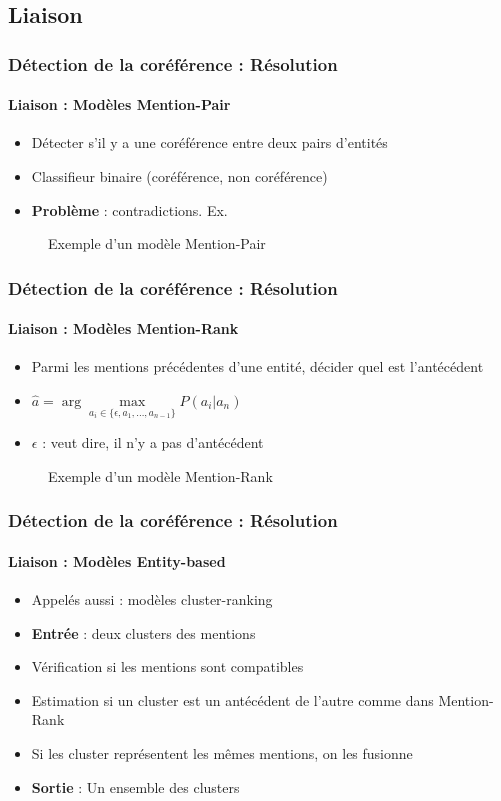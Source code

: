 \documentclass[xcolor=table]{beamer}
\begin{document}
\subsection{Liaison}

\begin{frame}
	\frametitle{Détection de la coréférence : Résolution}
	\framesubtitle{Liaison : Modèles Mention-Pair}
	
	\begin{itemize}
		\item Détecter s'il y a une coréférence entre deux pairs d'entités
		\item Classifieur binaire (coréférence, non coréférence)
		\item \textbf{Problème} : contradictions. Ex. 
	\end{itemize}
	\begin{figure}
		\centering
		\caption{Exemple d'un modèle Mention-Pair \cite{2019-jurafsky-martin}}
	\end{figure}
	
\end{frame}

\begin{frame}
	\frametitle{Détection de la coréférence : Résolution}
	\framesubtitle{Liaison : Modèles Mention-Rank}
	
	\begin{itemize}
		\item Parmi les mentions précédentes d'une entité, décider quel est l'antécédent
		\item $ \hat{a} = \arg\max\limits_{a_i \in \{\epsilon, a_1, \ldots, a_{n-1}\}} P(a_i|a_n) $
		\item $ \epsilon $ : veut dire, il n'y a pas d'antécédent
	\end{itemize}
	\begin{figure}
		\centering
		\caption{Exemple d'un modèle Mention-Rank \cite{2019-jurafsky-martin}}
	\end{figure}
	
\end{frame}

\begin{frame}
	\frametitle{Détection de la coréférence : Résolution}
	\framesubtitle{Liaison : Modèles Entity-based}
	
	\begin{itemize}
		\item Appelés aussi : modèles cluster-ranking
		\item \textbf{Entrée} : deux clusters des mentions
		\item Vérification si les mentions sont compatibles
		\item Estimation si un cluster est un antécédent de l'autre comme dans Mention-Rank
		\item Si les cluster représentent les mêmes mentions, on les fusionne
		\item \textbf{Sortie} : Un ensemble des clusters
	\end{itemize}
	
\end{frame}
\end{document}

